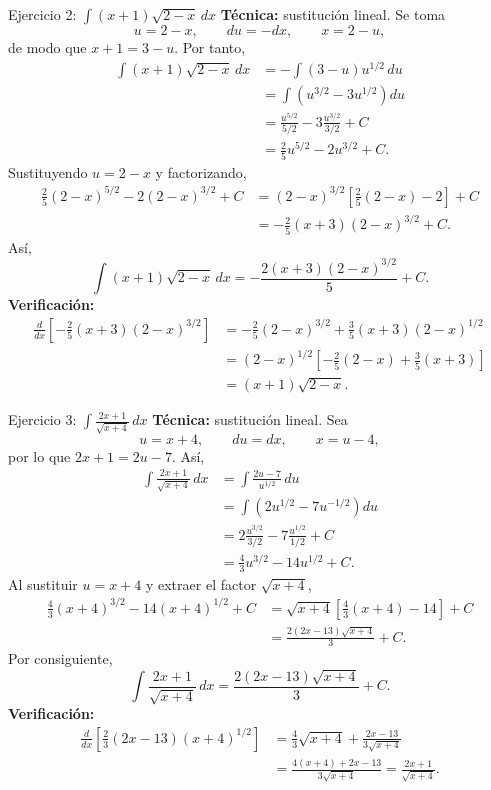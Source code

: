 \begin{activitybox}{Ejercicio 2: $\displaystyle \int(x+1)\sqrt{2-x}\,dx$}
\textbf{Técnica:} sustitución lineal. Se toma
\[
 u=2-x,\qquad du=-dx,\qquad x=2-u,
\]
de modo que $x+1=3-u$. Por tanto,
\begin{align*}
 \int(x+1)\sqrt{2-x}\,dx
 &=-\int(3-u)u^{1/2}\,du\\
 &=\int\left(u^{3/2}-3u^{1/2}\right)du\\
 &=\frac{u^{5/2}}{5/2}-3\frac{u^{3/2}}{3/2}+C\\
 &=\frac25u^{5/2}-2u^{3/2}+C.
\end{align*}
Sustituyendo $u=2-x$ y factorizando,
\begin{align*}
 \frac25(2-x)^{5/2}-2(2-x)^{3/2}+C
 &=(2-x)^{3/2}\left[\frac25(2-x)-2\right]+C\\
 &=-\frac25(x+3)(2-x)^{3/2}+C.
\end{align*}
Así,
\[
 \boxed{\int(x+1)\sqrt{2-x}\,dx
 =-\frac{2(x+3)(2-x)^{3/2}}{5}+C}.
\]
\textbf{Verificación:}
\begin{align*}
 \frac{d}{dx}\left[-\frac25(x+3)(2-x)^{3/2}\right]
 &=-\frac25(2-x)^{3/2}+\frac35(x+3)(2-x)^{1/2}\\
 &=(2-x)^{1/2}\left[-\frac25(2-x)+\frac35(x+3)\right]\\
 &=(x+1)\sqrt{2-x}.
\end{align*}
\end{activitybox}

\begin{activitybox}{Ejercicio 3: $\displaystyle \int\frac{2x+1}{\sqrt{x+4}}\,dx$}
\textbf{Técnica:} sustitución lineal. Sea
\[
 u=x+4,\qquad du=dx,\qquad x=u-4,
\]
por lo que $2x+1=2u-7$. Así,
\begin{align*}
 \int\frac{2x+1}{\sqrt{x+4}}\,dx
 &=\int\frac{2u-7}{u^{1/2}}\,du\\
 &=\int\left(2u^{1/2}-7u^{-1/2}\right)du\\
 &=2\frac{u^{3/2}}{3/2}-7\frac{u^{1/2}}{1/2}+C\\
 &=\frac43u^{3/2}-14u^{1/2}+C.
\end{align*}
Al sustituir $u=x+4$ y extraer el factor $\sqrt{x+4}$,
\begin{align*}
 \frac43(x+4)^{3/2}-14(x+4)^{1/2}+C
 &=\sqrt{x+4}\left[\frac43(x+4)-14\right]+C\\
 &=\frac{2(2x-13)\sqrt{x+4}}3+C.
\end{align*}
Por consiguiente,
\[
 \boxed{\int\frac{2x+1}{\sqrt{x+4}}\,dx
 =\frac{2(2x-13)\sqrt{x+4}}{3}+C}.
\]
\textbf{Verificación:}
\begin{align*}
 \frac{d}{dx}\left[\frac23(2x-13)(x+4)^{1/2}\right]
 &=\frac43\sqrt{x+4}+\frac{2x-13}{3\sqrt{x+4}}\\
 &=\frac{4(x+4)+2x-13}{3\sqrt{x+4}}
 =\frac{2x+1}{\sqrt{x+4}}.
\end{align*}
\end{activitybox}

